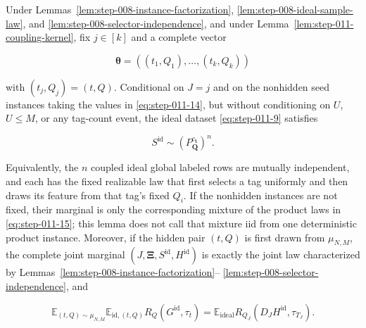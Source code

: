 \begin{lemma}\label{lem:step-011-ideal-marginal}
Under Lemmas~\ref{lem:step-008-instance-factorization},
\ref{lem:step-008-ideal-sample-law}, and
\ref{lem:step-008-selector-independence}, and under
Lemma~\ref{lem:step-011-coupling-kernel}, fix \(j\in[k]\) and a complete
vector

\[
  \boldsymbol\theta=((t_1,Q_1),\ldots,(t_k,Q_k))
\tag{S11.14}\label{eq:step-011-14}
\]

with \((t_j,Q_j)=(t,Q)\). Conditional on \(J=j\) and on the nonhidden
seed instances taking the values in \eqref{eq:step-011-14}, but without conditioning on
\(U\), \(U\le M\), or any tag-count event, the ideal dataset \eqref{eq:step-011-9} satisfies

\[
  S^{\mathrm{id}}\sim
  \left(P_{\boldsymbol Q}^{c_{\boldsymbol t}}\right)^n.
\tag{S11.15}\label{eq:step-011-15}
\]

Equivalently, the \(n\) coupled ideal global labeled rows are mutually independent,
and each has the fixed realizable law that first selects a tag uniformly
and then draws its feature from that tag's fixed \(Q_i\). If the nonhidden
instances are not fixed, their marginal is only the corresponding mixture
of the product laws in \eqref{eq:step-011-15}; this lemma does not call that mixture iid from
one deterministic product instance. Moreover, if the hidden pair
\((t,Q)\) is first drawn from \(\mu_{N,M}\), the complete joint marginal
\((J,\boldsymbol\Xi,S^{\mathrm{id}},H^{\mathrm{id}})\) is exactly the
joint law characterized by Lemmas~\ref{lem:step-008-instance-factorization}--
\ref{lem:step-008-selector-independence}, and

\[
  \mathbb E_{(t,Q)\sim\mu_{N,M}}
    \mathbb E_{\mathrm{id},(t,Q)}R_Q(G^{\mathrm{id}},\tau_t)
  =\mathbb E_{\mathrm{ideal}}
    R_{Q_J}(D_JH^{\mathrm{id}},\tau_{T_J}).
\tag{S11.15a}\label{eq:step-011-15a}
\]
\end{lemma}

